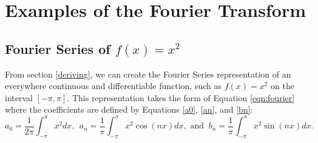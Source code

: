 \documentclass[11pt]{amsart}
\theoremstyle{plain}
\theoremstyle{definition}
\begin{document}
\section{Examples of the Fourier Transform} \label{x2}
\subsection{Fourier Series of $f(x)=x^2$}
From section \ref{deriving}, we can create the Fourier Series representation of an everywhere continuous and differentiable function, such as $f(x)=x^2$ on the interval $[-\pi, \pi]$. This representation takes the form of Equation \ref{eqn:fourier} where the coefficients are defined by Equations \ref{a0}, \ref{an}, and \ref{bn}:
\[a_0=\frac{1}{2\pi}\int_{-\pi}^\pi x^2dx, \ \ a_n=\frac{1}{\pi}\int_{-\pi}^\pi x^2\cos(nx)dx, \text{ and }\ b_n=\frac{1}{\pi}\int_{-\pi}^\pi x^2\sin(nx)dx.\]
\end{document}
